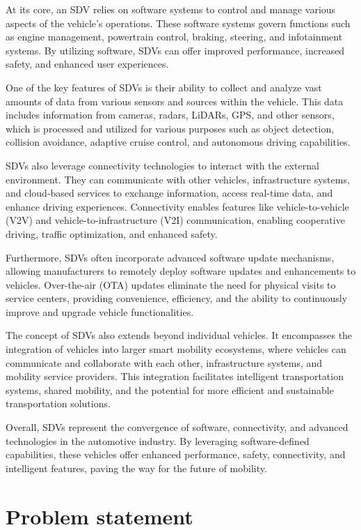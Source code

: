 \documentclass[
12pt,
oneside, 
onehalfspacing, 
nolistspacing, 
parskip, 
chapterinoneline, 
]{AASTCOMPUTER}
\begin{document}
At its core, an SDV relies on software systems to control and manage various aspects of the vehicle's operations. These software systems govern functions such as engine management, powertrain control, braking, steering, and infotainment systems. By utilizing software, SDVs can offer improved performance, increased safety, and enhanced user experiences.

One of the key features of SDVs is their ability to collect and analyze vast amounts of data from various sensors and sources within the vehicle. This data includes information from cameras, radars, LiDARs, GPS, and other sensors, which is processed and utilized for various purposes such as object detection, collision avoidance, adaptive cruise control, and autonomous driving capabilities.

SDVs also leverage connectivity technologies to interact with the external environment. They can communicate with other vehicles, infrastructure systems, and cloud-based services to exchange information, access real-time data, and enhance driving experiences. Connectivity enables features like vehicle-to-vehicle (V2V) and vehicle-to-infrastructure (V2I) communication, enabling cooperative driving, traffic optimization, and enhanced safety.

Furthermore, SDVs often incorporate advanced software update mechanisms, allowing manufacturers to remotely deploy software updates and enhancements to vehicles. Over-the-air (OTA) updates eliminate the need for physical visits to service centers, providing convenience, efficiency, and the ability to continuously improve and upgrade vehicle functionalities.

The concept of SDVs also extends beyond individual vehicles. It encompasses the integration of vehicles into larger smart mobility ecosystems, where vehicles can communicate and collaborate with each other, infrastructure systems, and mobility service providers. This integration facilitates intelligent transportation systems, shared mobility, and the potential for more efficient and sustainable transportation solutions.

Overall, SDVs represent the convergence of software, connectivity, and advanced technologies in the automotive industry. By leveraging software-defined capabilities, these vehicles offer enhanced performance, safety, connectivity, and intelligent features, paving the way for the future of mobility.

\section{Problem statement}
\end{document}
